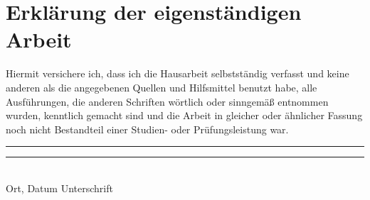 \documentclass{jura}
\begin{document}
	\section*{Erklärung der eigenständigen Arbeit}
	
	Hiermit versichere ich, dass ich die Hausarbeit selbstständig verfasst und keine anderen als die angegebenen Quellen und Hilfsmittel benutzt habe, alle Ausführungen, die anderen Schriften wörtlich oder sinngemäß entnommen wurden, kenntlich gemacht sind und die Arbeit in gleicher oder ähnlicher Fassung noch nicht Bestandteil einer Studien- oder Prüfungsleistung war.
	
	\vspace{1.5cm}
	\rule{4cm}{0.1pt} \hfill \rule{7cm}{0.1pt} \\
	\hspace*{0.2cm} Ort, Datum \hspace*{2.4cm} Unterschrift
	
\end{document}
